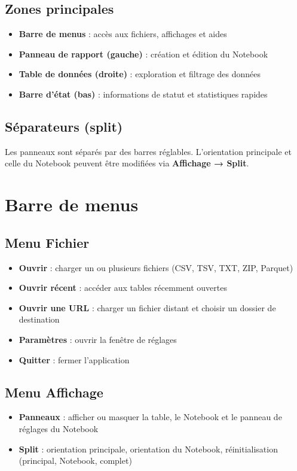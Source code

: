 \documentclass[11pt, a4paper]{article}
\begin{document}
\subsection{Zones principales}
\begin{itemize}
    \item \textbf{Barre de menus} : accès aux fichiers, affichages et aides
    \item \textbf{Panneau de rapport (gauche)} : création et édition du Notebook
    \item \textbf{Table de données (droite)} : exploration et filtrage des données
    \item \textbf{Barre d'état (bas)} : informations de statut et statistiques rapides
\end{itemize}

\subsection{Séparateurs (split)}
Les panneaux sont séparés par des barres réglables. L'orientation principale et celle du Notebook peuvent être modifiées via \textbf{Affichage → Split}.

\section{Barre de menus}

\subsection{Menu Fichier}
\begin{itemize}
    \item \textbf{Ouvrir} : charger un ou plusieurs fichiers (CSV, TSV, TXT, ZIP, Parquet)
    \item \textbf{Ouvrir récent} : accéder aux tables récemment ouvertes
    \item \textbf{Ouvrir une URL} : charger un fichier distant et choisir un dossier de destination
    \item \textbf{Paramètres} : ouvrir la fenêtre de réglages
    \item \textbf{Quitter} : fermer l'application
\end{itemize}

\subsection{Menu Affichage}
\begin{itemize}
    \item \textbf{Panneaux} : afficher ou masquer la table, le Notebook et le panneau de réglages du Notebook
    \item \textbf{Split} : orientation principale, orientation du Notebook, réinitialisation (principal, Notebook, complet)
\end{itemize}
\end{document}
